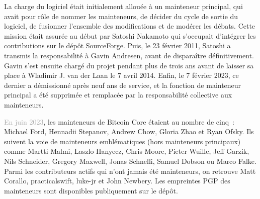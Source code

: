 La charge du logiciel était initialement allouée à un mainteneur principal, qui avait pour rôle de nommer les mainteneurs, de décider du cycle de sortie du logiciel, de fusionner l'ensemble des modifications et de modérer les débats. Cette mission était assurée au début par Satoshi Nakamoto qui s'occupait d'intégrer les contributions sur le dépôt SourceForge. Puis, le 23 février 2011, Satoshi a transmis la responsabilité à Gavin Andresen, avant de disparaître définitivement. Gavin s'est ensuite chargé du projet pendant plus de trois ans avant de laisser sa place à Wladimir J. van der Laan le 7 avril 2014. Enfin, le 7 février 2023, ce dernier a démissionné après neuf ans de service, et la fonction de mainteneur principal a été supprimée et remplacée par la responsabilité collective aux mainteneurs.

\textcolor{darkgray}{En juin 2023}, les mainteneurs de Bitcoin Core étaient au nombre de cinq~: Michael Ford, Hennadii Stepanov, Andrew Chow, Gloria Zhao et Ryan Ofsky. Ils suivent la voie de mainteneurs emblématiques (hors mainteneurs principaux) comme Martti Malmi, Laszlo Hanyecz, Chris Moore, Pieter Wuille, Jeff Garzik, Nils Schneider, Gregory Maxwell, Jonas Schnelli, Samuel Dobson ou Marco Falke. Parmi les contributeurs actifs qui n'ont jamais été mainteneurs, on retrouve Matt Corallo, practicalswift, luke-jr et John Newbery.  Les empreintes PGP des mainteneurs sont disponibles publiquement sur le dépôt.

